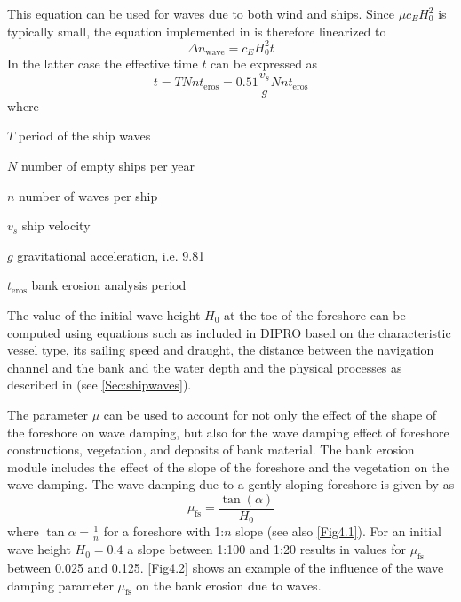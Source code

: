 %
This equation can be used for waves due to both wind and ships.
Since $\mu c_E H_0^2$ is typically small, the equation implemented in \dfastbe is therefore linearized to
%
\begin{equation}
\Delta n_\text{wave} = c_E H_0^2 t
\end{equation}
%
In the latter case the effective time $t$ can be expressed as
%
\begin{equation}
t = T N n t_\text{eros} = 0.51 \frac{v_s}{g} N n t_\text{eros}
\end{equation}
%
where
%
\begin{symbollist}
\item[$T$] period of the ship waves 
\item[$N$] number of empty ships per year 
\item[$n$] number of waves per ship \unitbrackets{-}
\item[$v_s$] ship velocity 
\item[$g$] gravitational acceleration, i.e. 9.81 
\item[$t_\text{eros}$] bank erosion analysis period 
\end{symbollist}
%
The value of the initial wave height $H_0$ at the toe of the foreshore can be computed using equations such as included in DIPRO based on the characteristic vessel type, its sailing speed and draught, the distance between the navigation channel and the bank and the water depth and the physical processes as described in\cite{rockmanual} (see \autoref{Sec:shipwaves}).

The parameter $\mu$ can be used to account for not only the effect of the shape of the foreshore on wave damping, but also for the wave damping effect of foreshore constructions, vegetation, and deposits of bank material.
The bank erosion module includes the effect of the slope of the foreshore and the vegetation on the wave damping.
The wave damping due to a gently sloping foreshore is given by \citet{Verheij00} as
%
\begin{equation}
\mu_\text{fs} = \frac{\tan(\alpha)}{H_0}
\end{equation}
%
where $\tan \alpha = \frac{1}{n}$ for a foreshore with 1:$n$ slope (see also \autoref{Fig4.1}).
For an initial wave height $H_0 = 0.4$ a slope between 1:100 and 1:20 results in values for $\mu_\text{fs}$ between 0.025 and 0.125.
\autoref{Fig4.2} shows an example of the influence of the wave damping parameter $\mu_\text{fs}$ on the bank erosion due to waves.

